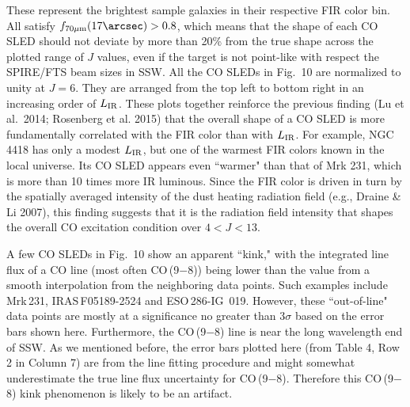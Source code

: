 \documentclass[preprint]{aastex}
\newcommand{\LIR}{\mbox{$L_{\rm IR}$}}
\begin{document}
These represent the brightest sample galaxies in their respective FIR color bin.
All satisfy $f_{70\mu{\rm m}}(17\arcsec) > 0.8$, which means that the shape of 
each CO SLED should not deviate by more than 20\% from the true shape across 
the plotted range of $J$ values, even if the target is not point-like with respect 
the SPIRE/FTS beam sizes in SSW.    All the CO SLEDs in Fig.~10 
are normalized to unity at $J = 6$.  They are arranged from the top left 
to bottom right in an increasing order of \LIR.  These plots together reinforce
the previous finding (Lu et al.~2014; Rosenberg et al. 2015) that the overall shape 
of a CO SLED is more fundamentally correlated with the FIR color than with \LIR. 
For example, NGC\,4418 has only a modest \LIR, but one of the warmest FIR colors known 
in the local universe.  Its CO SLED appears even  ``warmer" than that of Mrk 231, 
which is more than 10 times more IR luminous.  
Since the FIR color is driven in turn by the spatially
averaged intensity of the dust heating radiation field (e.g., Draine \& Li 2007), 
this finding suggests that it is the radiation field intensity that shapes the overall
CO excitation condition over $4 < J < 13$.



A few CO SLEDs in Fig.~10 show an apparent ``kink," with the integrated line flux 
of a CO line (most often CO\,(9$-$8)) being lower than the value from a smooth 
interpolation from the neighboring data points. 
Such examples include Mrk\,231,  IRAS\,F05189-2524 and ESO\,286-IG~019. However, 
these ``out-of-line" data points are mostly at a significance no greater than 3$\sigma$
based on the error bars shown here.  Furthermore, the CO\,(9$-$8) line is near 
the long wavelength end of SSW.  As we mentioned before, the error bars plotted 
here (from Table 4, Row 2 in Column 7) are from the line fitting procedure and
might somewhat underestimate the true line flux uncertainty for CO\,(9$-$8).  
Therefore this CO\,(9$-$8) kink phenomenon is likely to be an artifact.
\end{document}
